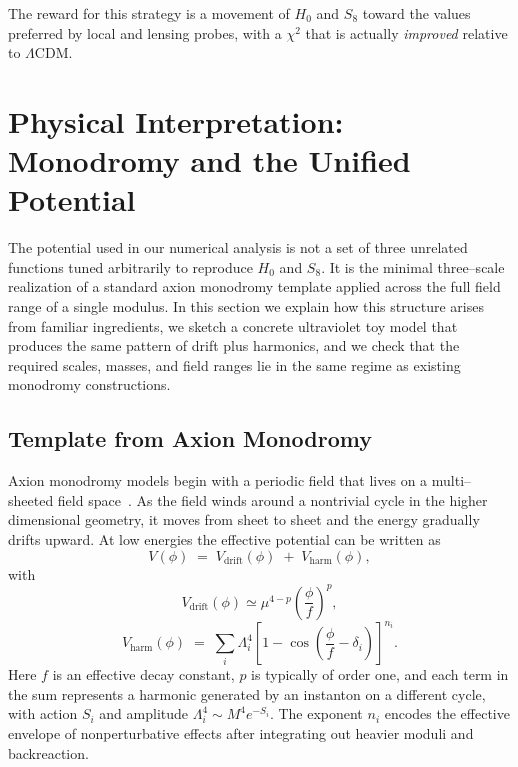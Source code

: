 \documentclass[a4paper,11pt]{article}
\begin{document}
The reward for this strategy is a movement of $H_0$ and $S_8$ toward the values preferred by local and lensing probes, with a $\chi^2$ that is actually \emph{improved} relative to $\Lambda$CDM.


\section{Physical Interpretation: Monodromy and the Unified Potential}

The potential used in our numerical analysis is not a set of three unrelated functions tuned arbitrarily to reproduce $H_0$ and $S_8$. It is the minimal three–scale realization of a standard axion monodromy template applied across the full field range of a single modulus. In this section we explain how this structure arises from familiar ingredients, we sketch a concrete ultraviolet toy model that produces the same pattern of drift plus harmonics, and we check that the required scales, masses, and field ranges lie in the same regime as existing monodromy constructions.


\subsection{Template from Axion Monodromy}
\label{sec:monodromy_template}

Axion monodromy models begin with a periodic field that lives on a multi–sheeted field space~\cite{Silverstein_Westphal, McAllister_monodromy}. As the field winds around a nontrivial cycle in the higher dimensional geometry, it moves from sheet to sheet and the energy gradually drifts upward. At low energies the effective potential can be written as
\begin{equation}
    V(\phi) \;=\; V_{\text{drift}}(\phi) \;+\; V_{\text{harm}}(\phi),
\end{equation}
with
\begin{equation}
    V_{\text{drift}}(\phi) \simeq \mu^{4-p} \left(\frac{\phi}{f}\right)^{p},
\end{equation}
\begin{equation}
    V_{\text{harm}}(\phi) \;=\; \sum_i \Lambda_i^4 \left[1 - \cos\!\left(\frac{\phi}{f} - \delta_i\right)\right]^{n_i}.
\end{equation}
Here $f$ is an effective decay constant, $p$ is typically of order one, and each term in the sum represents a harmonic generated by an instanton on a different cycle, with action $S_i$ and amplitude $\Lambda_i^4 \sim M^4 e^{-S_i}$. The exponent $n_i$ encodes the effective envelope of nonperturbative effects after integrating out heavier moduli and backreaction.
\end{document}
